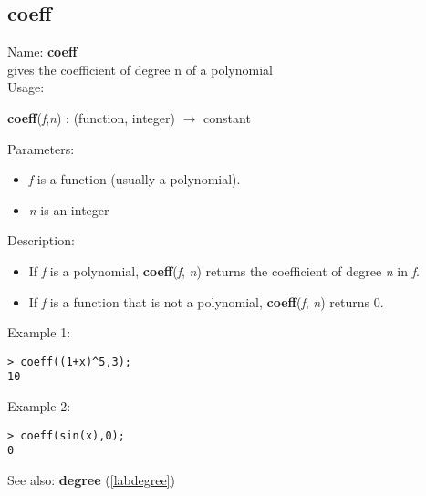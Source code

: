 \subsection{coeff}
\label{labcoeff}
\noindent Name: \textbf{coeff}\\
gives the coefficient of degree n of a polynomial\\
\noindent Usage: 
\begin{center}
\textbf{coeff}(\emph{f},\emph{n}) : (\textsf{function}, \textsf{integer}) $\rightarrow$ \textsf{constant}
\\ 
\end{center}
Parameters: 
\begin{itemize}
\item \emph{f} is a function (usually a polynomial).
\item \emph{n} is an integer
\end{itemize}
\noindent Description: \begin{itemize}

\item If \emph{f} is a polynomial, \textbf{coeff}(\emph{f}, \emph{n}) returns the coefficient of
   degree \emph{n} in \emph{f}.

\item If \emph{f} is a function that is not a polynomial, \textbf{coeff}(\emph{f}, \emph{n}) returns 0.
\end{itemize}
\noindent Example 1: 
\begin{center}\begin{minipage}{15cm}\begin{Verbatim}[frame=single]
> coeff((1+x)^5,3);
10
\end{Verbatim}
\end{minipage}\end{center}
\noindent Example 2: 
\begin{center}\begin{minipage}{15cm}\begin{Verbatim}[frame=single]
> coeff(sin(x),0);
0
\end{Verbatim}
\end{minipage}\end{center}
See also: \textbf{degree} (\ref{labdegree})
